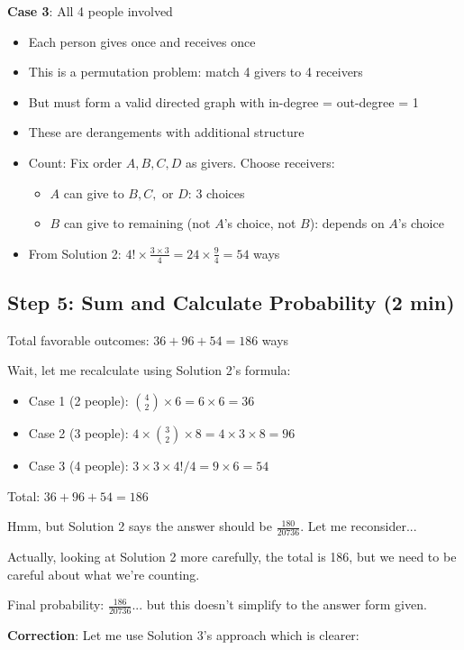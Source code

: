 \documentclass[]{article}
\begin{document}
\begin{solutionbox}
\textbf{Case 3}: All 4 people involved
\begin{itemize}
    \item Each person gives once and receives once
    \item This is a permutation problem: match 4 givers to 4 receivers
    \item But must form a valid directed graph with in-degree = out-degree = 1
    \item These are derangements with additional structure
    \item Count: Fix order $A,B,C,D$ as givers. Choose receivers:
    \begin{itemize}
        \item $A$ can give to $B,C,$ or $D$: 3 choices
        \item $B$ can give to remaining (not $A$'s choice, not $B$): depends on $A$'s choice
    \end{itemize}
    \item From Solution 2: $4! \times \frac{3 \times 3}{4} = 24 \times \frac{9}{4} = 54$ ways
\end{itemize}

\subsection*{Step 5: Sum and Calculate Probability (2 min)}
Total favorable outcomes: $36 + 96 + 54 = 186$ ways

Wait, let me recalculate using Solution 2's formula:
\begin{itemize}
    \item Case 1 (2 people): $\binom{4}{2} \times 6 = 6 \times 6 = 36$
    \item Case 2 (3 people): $4 \times \binom{3}{2} \times 8 = 4 \times 3 \times 8 = 96$
    \item Case 3 (4 people): $3 \times 3 \times 4! / 4 = 9 \times 6 = 54$
\end{itemize}
Total: $36 + 96 + 54 = 186$

Hmm, but Solution 2 says the answer should be $\frac{180}{20736}$. Let me reconsider...

Actually, looking at Solution 2 more carefully, the total is 186, but we need to be careful about what we're counting.

Final probability: $\frac{186}{20736}$... but this doesn't simplify to the answer form given.

\textbf{Correction}: Let me use Solution 3's approach which is clearer:


\end{solutionbox}
\end{document}
